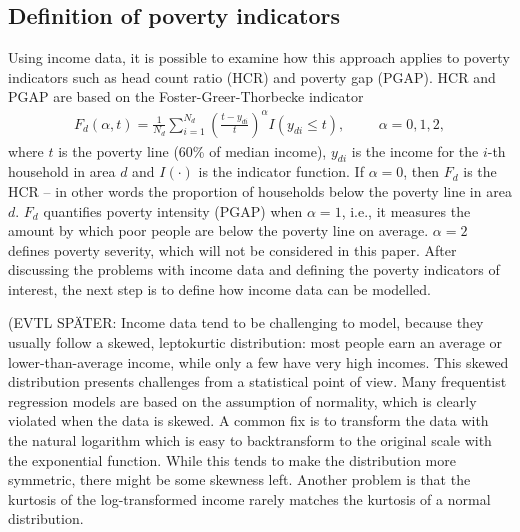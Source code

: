 \subsection{Definition of poverty indicators}


Using income data, it is possible to examine how this approach applies to poverty indicators such as head count ratio (HCR) and poverty gap (PGAP). HCR and PGAP are based on the Foster-Greer-Thorbecke indicator \citep{foster_class_1984}
\begin{gather*}
   F_d(\alpha, t) = \displaystyle \frac 1 {N_d} \sum_{i=1}^{N_d}\left( \frac{t - y_{di}}{t} \right)^\alpha I (y_{di} \le t),
   \hspace{1cm}\alpha = 0, 1, 2,
\end{gather*}
where $t$ is the poverty line (60\% of median income), $y_{di}$ is the income for the $i$-th household in area $d$ and $I(\cdot)$ is the indicator function. If $\alpha = 0$, then $F_d$ is the HCR – in other words the proportion of households below the poverty line in area $d$. $F_d$ quantifies poverty intensity (PGAP) when $\alpha = 1$, i.e., it measures the amount by which poor people are below the poverty line on average. $\alpha = 2$ defines poverty severity, which will not be considered in this paper. After discussing the problems with income data and defining the poverty indicators of interest, the next step is to define how income data can be modelled.

(EVTL SPÄTER: Income data tend to be challenging to model, because they usually follow a skewed, leptokurtic distribution: most people earn an average or lower-than-average income, while only a few have very high incomes. This skewed distribution presents challenges from a statistical point of view. Many frequentist regression models are based on the assumption of normality, which is clearly violated when the data is skewed.
A common fix is to transform the data with the natural logarithm which is easy to backtransform to the original scale with the exponential function. While this tends to make the distribution more symmetric, there might be some skewness left. Another problem is that the kurtosis of the log-transformed income rarely matches the kurtosis of a normal distribution.

